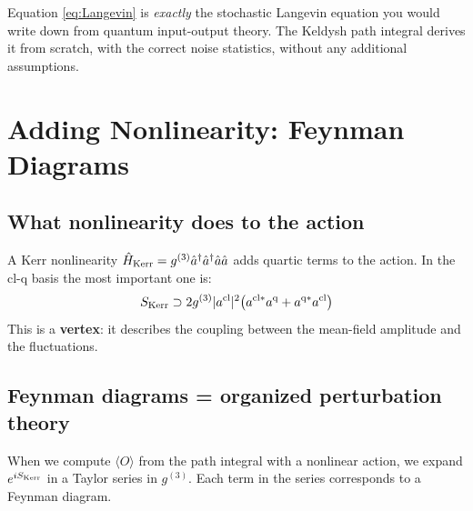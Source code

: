 \documentclass[12pt]{article}
\newcommand{\cl}{{\rm cl}}
\newcommand{\q}{{\rm q}}
\newcommand{\av}[1]{\langle #1 \rangle}
\providecommand{\cl}{{\rm cl}}
\providecommand{\q}{{\rm q}}
\begin{document}
\begin{punchline}
Equation \eqref{eq:Langevin} is \emph{exactly} the stochastic
Langevin equation you would write down from quantum input-output
theory. The Keldysh path integral derives it from scratch,
with the correct noise statistics, without any additional assumptions.
\end{punchline}

\section{Adding Nonlinearity: Feynman Diagrams}

\subsection{What nonlinearity does to the action}

A Kerr nonlinearity $\hat{H}_{\rm Kerr} = g^{(3)}\hat{a}^\dagger\hat{a}^\dagger\hat{a}\hat{a}$
adds quartic terms to the action. In the cl-q basis the most important one is:
\begin{equation}
  S_{\rm Kerr} \supset
  2g^{(3)}|a^\cl|^2\bigl(a^{\cl*}a^\q + a^{\q*}a^\cl\bigr)
  \label{eq:Kerr_vertex}
\end{equation}
This is a \textbf{vertex}: it describes the coupling between the
mean-field amplitude and the fluctuations.

\subsection{Feynman diagrams = organized perturbation theory}

When we compute $\av{\hat{O}}$ from the path integral with a
nonlinear action, we expand $e^{iS_{\rm Kerr}}$ in a Taylor series
in $g^{(3)}$. Each term in the series corresponds to a Feynman diagram.
\end{document}
